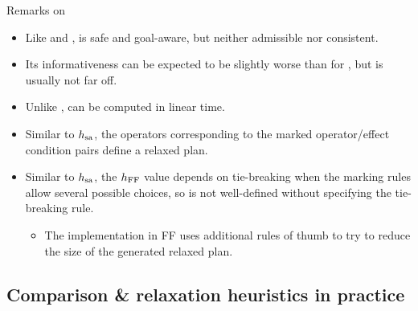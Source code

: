 \documentclass{gkibeamer}
\begin{document}
\begin{frame}{Remarks on {\hff}}
  \begin{itemize}
  \item Like {\hadd} and {\hsa}, {\hff} is \alert{safe} and
    \alert{goal-aware}, but neither \alert{admissible} nor
    \alert{consistent}.
  \item Its informativeness can be expected to be slightly worse than
    for \hsa, but is usually not far off.
  \item Unlike \hsa, {\hff} can be computed in \alert{linear time}.
  \item Similar to $h_{\text{sa}}$, the operators corresponding to the marked
    operator/effect condition pairs define a \alert{relaxed plan}.
  \item Similar to $h_{\text{sa}}$, the $h_{\text{FF}}$ value depends on tie-breaking
    when the marking rules allow several possible choices, so {\hff}
    is \alert{not well-defined} without specifying the tie-breaking
    rule.
    \begin{itemize}
    \item The implementation in FF uses additional rules of thumb
      to try to reduce the size of the generated relaxed plan.
    \end{itemize}
  \end{itemize}
\end{frame}

\subsection[Comparison \& practice]{Comparison \& relaxation
  heuristics in practice}

\end{document}
